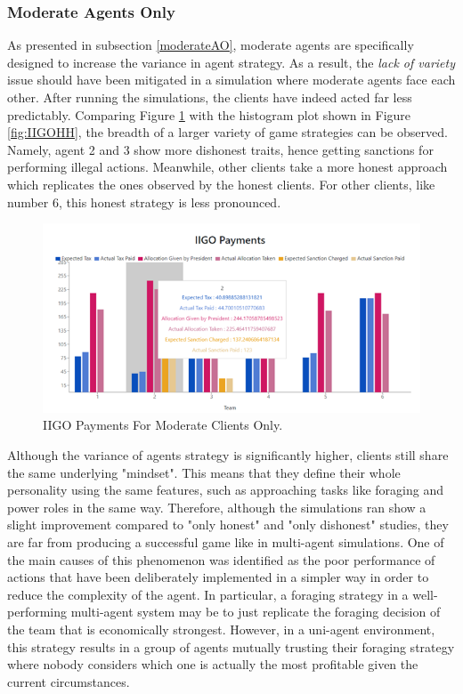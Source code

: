 \subsubsection{Moderate Agents Only}
As presented in subsection \ref{moderateAO}, moderate agents are specifically designed to increase the variance in agent strategy. As a result, the \emph{lack of variety} issue should have been mitigated in a simulation where moderate agents face each other. After running the simulations, the clients have indeed acted far less predictably. Comparing Figure \ref{fig:IIGOMM} with the histogram plot shown in Figure \ref{fig:IIGOHH}, the breadth of a larger variety of game strategies can be observed. Namely, agent 2 and 3 show more dishonest traits, hence getting sanctions for performing illegal actions. Meanwhile, other clients take a more honest approach which replicates the ones observed by the honest clients. For other clients, like number 6, this honest strategy is less pronounced.

\begin{figure}[H]
\centering
\includegraphics[scale=0.8]{12_team4_agentdesign/images/IIGOMM.png}
\caption{IIGO Payments For Moderate Clients Only.}
\label{fig:IIGOMM}
\end{figure}

Although the variance of agents strategy is significantly higher, clients still share the same underlying "mindset". This means that they define their whole personality using the same features, such as approaching tasks like foraging and power roles in the same way. Therefore, although the simulations ran show a slight improvement compared to "only honest" and "only dishonest" studies, they are far from producing a successful game like in multi-agent simulations. One of the main causes of this phenomenon was identified as the poor performance of actions that have been deliberately implemented in a simpler way in order to reduce the complexity of the agent. In particular, a foraging strategy in a well-performing multi-agent system may be to just replicate the foraging decision of the team that is economically strongest. However, in a uni-agent environment, this strategy  results in a group of agents mutually trusting their foraging strategy where nobody considers which one is actually the most profitable given the current circumstances.

